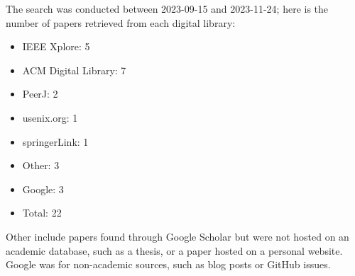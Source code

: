\documentclass[conference]{IEEEtran}
\begin{document}
The search was conducted between 2023-09-15 and 2023-11-24; here is the number of papers retrieved from each digital library:
\begin{itemize}
    \item IEEE Xplore: 5
    \item ACM Digital Library: 7
    \item PeerJ: 2
    \item usenix.org: 1
    \item springerLink: 1
    \item Other: 3
    \item Google: 3
    \item Total: 22
\end{itemize}

Other include papers found through Google Scholar but were not hosted on an academic database, such as a thesis, or a paper hosted on a personal website.
Google was for non-academic sources, such as blog posts or GitHub issues.
\end{document}
